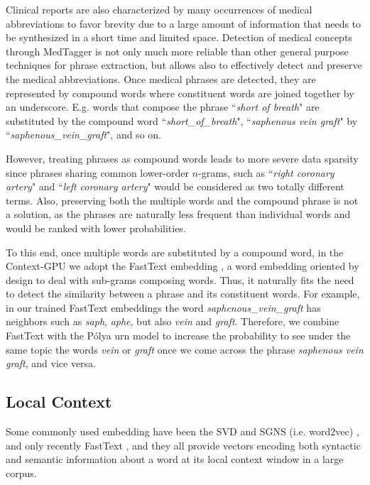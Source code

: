 \documentclass[letterpaper]{article}
\begin{document}
Clinical reports are also characterized by many occurrences of medical abbreviations to favor brevity due to a large amount of information that needs to be synthesized in a short time and limited space. Detection of medical concepts through MedTagger is not only much more reliable than other general purpose techniques for phrase extraction, but allows also to effectively detect and preserve the medical abbreviations.
Once medical phrases are detected, they are represented by compound words where constituent words are joined together by an underscore. E.g. words that compose the phrase ``\textit{short of breath}" are substituted by the compound word ``\textit{short\_of\_breath}", ``\textit{saphenous vein graft}" by ``\textit{saphenous\_vein\_graft}", and so on.

However, treating phrases as compound words leads to more severe data sparsity since phrases sharing common lower-order $n$-grams, such as ``\emph{right coronary artery}" and ``\emph{left coronary artery}" would be considered as two totally different terms. %
Also, preserving both the multiple words and the compound phrase is not a solution, as the phrases are naturally less frequent than individual words and would be ranked with lower probabilities.

To this end, once multiple words are substituted by a compound word, in the Context-GPU we adopt the FastText embedding \cite{Joulin16}, a word embedding oriented by design to deal with sub-grams composing words. Thus, it naturally fits the need to detect the similarity between a phrase and its constituent words. For example, in our trained FastText embeddings the word \textit{saphenous\_vein\_graft} has neighbors such as \textit{saph}, \textit{aphe}, but also \textit{vein} and \textit{graft}.
Therefore, we combine FastText with the P\'{o}lya urn model to increase the probability to see under the same topic the words \textit{vein} or \textit{graft} once we come across the phrase \textit{saphenous vein graft}, and vice versa.



\subsection{Local Context}
Some commonly used embedding have been the SVD \cite{Levy15} and SGNS (i.e. word2vec) \cite{Mikolov13a}, and only recently FastText \cite{Joulin16}, and they all provide vectors encoding both syntactic and semantic information about a word at its local context window in a large corpus.
\end{document}
